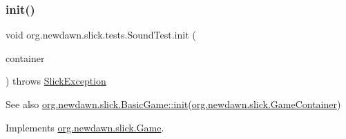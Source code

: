 \subsubsection{\texorpdfstring{init()}{init()}}
{\footnotesize\ttfamily void org.\+newdawn.\+slick.\+tests.\+Sound\+Test.\+init (\begin{DoxyParamCaption}\item[{\mbox{\hyperlink{classorg_1_1newdawn_1_1slick_1_1_game_container}{Game\+Container}}}]{container }\end{DoxyParamCaption}) throws \mbox{\hyperlink{classorg_1_1newdawn_1_1slick_1_1_slick_exception}{Slick\+Exception}}\hspace{0.3cm}{\ttfamily [inline]}}

\begin{DoxySeeAlso}{See also}
\mbox{\hyperlink{classorg_1_1newdawn_1_1slick_1_1_basic_game_a8af0900217e4d389249f71367b22d114}{org.\+newdawn.\+slick.\+Basic\+Game\+::init}}(\mbox{\hyperlink{classorg_1_1newdawn_1_1slick_1_1_game_container}{org.\+newdawn.\+slick.\+Game\+Container}}) 
\end{DoxySeeAlso}


Implements \mbox{\hyperlink{interfaceorg_1_1newdawn_1_1slick_1_1_game_ad2dd6affab08bb8fdb5fab0815957b7a}{org.\+newdawn.\+slick.\+Game}}.



